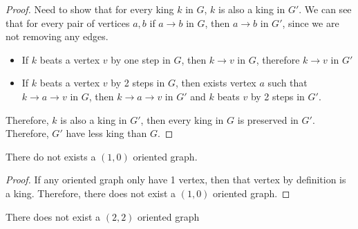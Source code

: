 \begin{proof}
  Need to show that for every king \(k\) in \(G\),
  \(k\) is also a king in \(G'\).
  We can see that for every pair of vertices \(a, b\)
  if \(a \to b\) in \(G\), then \(a \to b\) in \(G'\),
  since we are not removing any edges.

  \begin{itemize}
    \item
      If \(k\) beats a vertex \(v\) by one step in \(G\),
      then \(k \to v\) in \(G\),
      therefore \(k \to v\) in \(G'\)
    \item
      If \(k\) beats a vertex \(v\) by 2 steps in \(G\),
      then exists vertex \(a\) such that
      \(k \to a \to v\) in \(G\), then \(k \to a \to v\) in \(G'\)
      and \(k\) beats \(v\) by 2 steps in \(G'\).
  \end{itemize}

  Therefore, \(k\) is also a king in \(G'\),
  then every king in \(G\) is preserved in \(G'\).
  Therefore, \(G'\) have less king than \(G\).
\end{proof}

\begin{lemma}\label{the: no (1 0) oriented graph}
  There do not exists a \((1, 0)\) oriented graph.
\end{lemma}
\begin{proof}
  If any oriented graph only have 1 vertex,
  then that vertex by definition is a king.
  Therefore, there does not exist a \((1, 0)\) oriented graph.
\end{proof}

\begin{lemma}\label{the: no (2 2) oriented graph}
  There does not exist a \((2, 2)\) oriented graph
\end{lemma}

